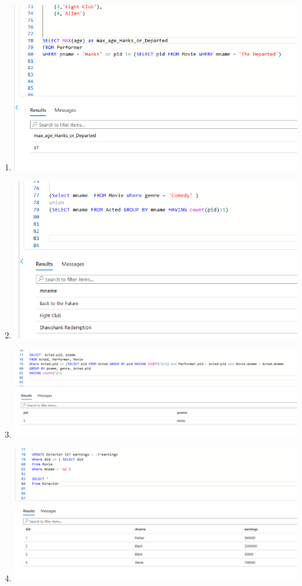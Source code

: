 \documentclass[11pt]{article}
\begin{document}
\begin{enumerate}
\item \includegraphics[width = \textwidth]{hanksOrDepartedOldMan.png}
\item \includegraphics[width = \textwidth]{comedyorLead.png}
\item \includegraphics[width = \textwidth]{sameGenre.png}
\item \includegraphics[width = \textwidth]{change.png}

\end{enumerate}
\end{document}
